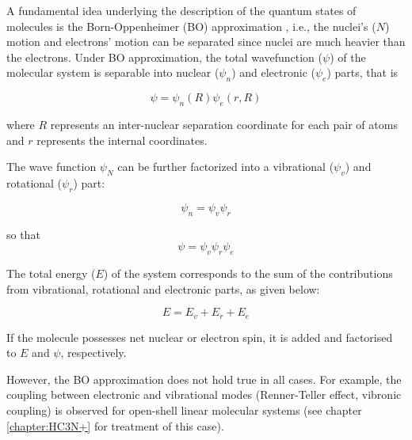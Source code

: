 A fundamental idea underlying the description of the quantum states of
molecules is the Born-Oppenheimer (BO) approximation \cite{born_zur_1927},
i.e., the nuclei's ($N$) motion and electrons' motion can be separated since
nuclei are much heavier than the electrons. Under BO approximation, the total
wavefunction ($\psi$) of the molecular system is separable into nuclear
($\psi_n$) and electronic ($\psi_e$) parts, that is

\begin{equation*}
    \psi = \psi_n (R) \psi_{e}(r, R)
\end{equation*}

where $R$ represents an inter-nuclear separation coordinate for each pair of
atoms and $r$ represents the internal coordinates.

The wave function $\psi_N$ can be further factorized into a vibrational
($\psi_v$) and rotational ($\psi_r$) part:

\begin{equation*}
    \psi_n = \psi_v \psi_{r}
\end{equation*}

so that
\[ \psi = \psi_v \psi_{r} \psi_{e} \]

The total energy ($E$) of the system corresponds to the sum of the
contributions from vibrational, rotational and electronic parts, as given
below:

\begin{equation*}
    E =  E_{v} + E_{r} + E_{e}
\end{equation*}

If the molecule possesses net nuclear or electron spin, it is added and
factorised to $E$ and $\psi$, respectively.

However, the BO approximation does not hold true in all cases. For example, the
coupling between electronic and vibrational modes (Renner-Teller effect,
vibronic coupling) is observed for open-shell linear molecular systems (see
chapter \ref{chapter:HC3N+} for treatment of this case).


